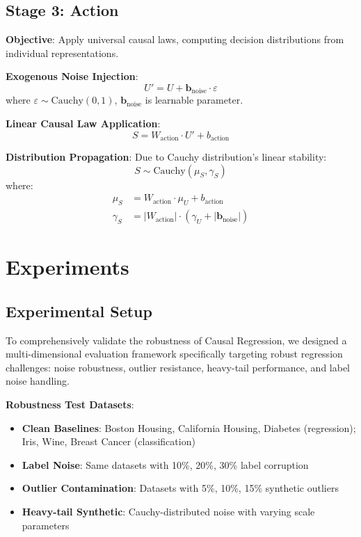 \documentclass[letterpaper]{article} %
\newcommand{\cauchy}{\text{Cauchy}}
\begin{document}
\subsection{Stage 3: Action}

\textbf{Objective}: Apply universal causal laws, computing decision distributions from individual representations.

\textbf{Exogenous Noise Injection}:
\begin{equation}
U' = U + \mathbf{b}_{\text{noise}} \cdot \varepsilon
\end{equation}
where $\varepsilon \sim \cauchy(0, 1)$, $\mathbf{b}_{\text{noise}}$ is learnable parameter.

\textbf{Linear Causal Law Application}:
\begin{equation}
S = W_{\text{action}} \cdot U' + b_{\text{action}}
\end{equation}

\textbf{Distribution Propagation}: Due to Cauchy distribution's linear stability:
\begin{equation}
S \sim \cauchy(\mu_S, \gamma_S)
\end{equation}
where:
\begin{align}
\mu_S &= W_{\text{action}} \cdot \mu_U + b_{\text{action}} \\
\gamma_S &= |W_{\text{action}}| \cdot (\gamma_U + |\mathbf{b}_{\text{noise}}|)
\end{align}

\section{Experiments}

\subsection{Experimental Setup}

To comprehensively validate the robustness of Causal Regression, we designed a multi-dimensional evaluation framework specifically targeting robust regression challenges: noise robustness, outlier resistance, heavy-tail performance, and label noise handling.

\textbf{Robustness Test Datasets}:
\begin{itemize}
\item \textbf{Clean Baselines}: Boston Housing, California Housing, Diabetes (regression); Iris, Wine, Breast Cancer (classification)
\item \textbf{Label Noise}: Same datasets with 10\%, 20\%, 30\% label corruption
\item \textbf{Outlier Contamination}: Datasets with 5\%, 10\%, 15\% synthetic outliers
\item \textbf{Heavy-tail Synthetic}: Cauchy-distributed noise with varying scale parameters
\end{itemize}
\end{document}
